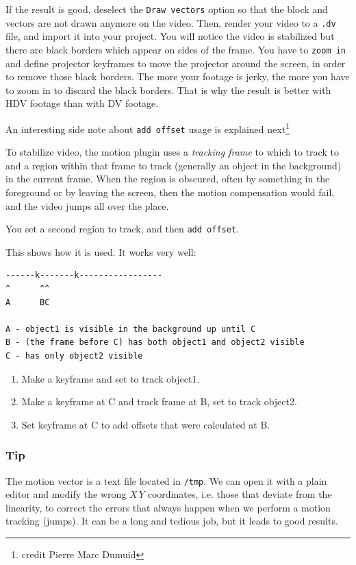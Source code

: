 If the result is good, deselect the \texttt{Draw vectors} option so that the block and vectors are not drawn anymore on the video. Then, render your video to a \texttt{.dv} file, and import it into your project. You will notice the video is stabilized but there are black borders which appear on sides of the frame. You have to \texttt{zoom in} and define projector keyframes to move the projector around the screen, in order to remove those black borders. The more your footage is jerky, the more you have to zoom in to discard the black borders. That is why the result is better with HDV footage than with DV footage.

An interesting side note about \texttt{add offset} usage is explained next\protect\footnote{credit Pierre Marc Dumuid}

To stabilize video, the motion plugin uses a \textit{tracking frame} to which to track to and a region within that frame to track (generally an object in the background) in the current frame.  When the region is obscured, often by something in the foreground or by leaving the screen, then the motion compensation would fail, and the video jumps all over the place.

You set a second region to track, and then \texttt{add offset}.

This shows how it is used.  It works very well:

\begin{verbatim}
------k-------k-----------------
^      ^^
A      BC

A - object1 is visible in the background up until C
B - (the frame before C) has both object1 and object2 visible
C - has only object2 visible
\end{verbatim}

\begin{enumerate}
    \item Make a keyframe and set to track object1.
    \item Make a keyframe at C and track frame at B, set to track object2.
    \item Set keyframe at C to add offsets that were calculated at B.
\end{enumerate}

\subsubsection*{Tip}
\label{ssub:tip}

The motion vector is a text file located in \texttt{/tmp}. We can open it with a plain editor and modify the wrong $X\,Y$ coordinates, i.e. those that deviate from the linearity, to correct the errors that always happen when we perform a motion tracking (jumps). It can be a long and tedious job, but it leads to good results.

